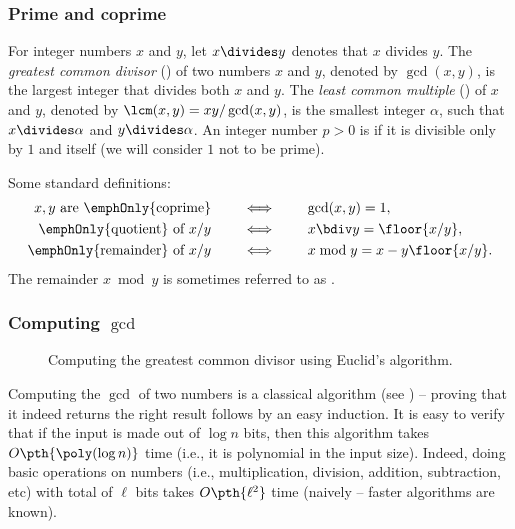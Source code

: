 \subsubsection{Prime and coprime}
For integer numbers $x$ and $y$, let $x \divides y$ denotes that $x$
divides $y$. The \emph{greatest common divisor} () of two
numbers $x$ and $y$, denoted by $\gcd(x,y)$, is the largest integer
that divides both $x$ and $y$. The \emph{least common multiple}
() of $x$ and $y$, denoted by $\lcm(x,y) = xy /
\gcd(x,y)$, is the smallest integer $\alpha$, such that $x \divides
\alpha$ and $y \divides \alpha$. An integer number $p > 0$ is
 if it is divisible only by $1$ and itself (we will
consider $1$ not to be prime).

Some standard definitions:
\begin{align*}
    x,y \text{ are \emphOnly{coprime}}
    \qquad &\iff \qquad \gcd(x,y)=1,\\
    \text{\emphOnly{quotient} of } x/y \qquad
    &\iff \qquad
    x \bdiv y = \floor{x/y},\\
    \text{\emphOnly{remainder} of }x /y \qquad
    &\iff \qquad x \bmod y =
    x - y \floor{x/y}.
\end{align*}
%
The remainder $x \bmod y$ is sometimes referred to as .


\subsubsection{Computing $\gcd$}

\begin{figure}[t]
   \centering
   \caption{Computing the greatest common divisor using Euclid's algorithm.}
\end{figure}


Computing the $\gcd$ of two numbers is a classical algorithm (see
) -- proving that it indeed returns the right result
follows by an easy induction. It is easy to verify that if the input
is made out of $\log n$ bits, then this algorithm takes $O\pth{ \poly(
   \log n )}$ time (i.e., it is polynomial in the input size). Indeed,
doing basic operations on numbers (i.e., multiplication, division,
addition, subtraction, etc) with total of $\ell$ bits takes $O\pth{
   \ell^2 }$ time (naively -- faster algorithms are known).

